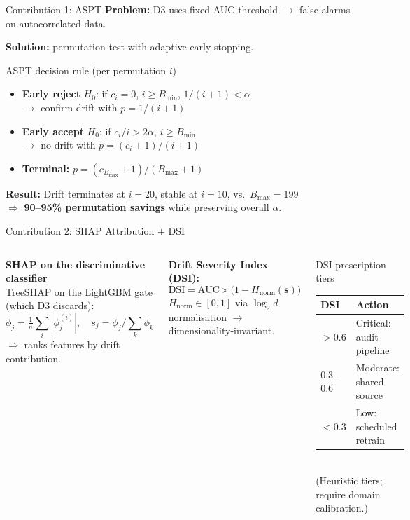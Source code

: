 \documentclass[aspectratio=169,10pt]{beamer}
\begin{document}
\begin{frame}{Contribution 1: ASPT}
\textbf{Problem:} D3 uses fixed AUC threshold $\to$ false alarms on autocorrelated data.

\textbf{Solution:} permutation test with adaptive early stopping.

\begin{block}{ASPT decision rule (per permutation $i$)}
\begin{itemize}\small
  \item \textbf{Early reject} $H_0$: if $c_i{=}0$, $i{\ge}B_{\min}$, $1/(i{+}1)<\alpha$ \\
        $\to$ confirm drift with $p = 1/(i{+}1)$
  \item \textbf{Early accept} $H_0$: if $c_i/i > 2\alpha$, $i{\ge}B_{\min}$ \\
        $\to$ no drift with $p = (c_i{+}1)/(i{+}1)$
  \item \textbf{Terminal:} $p = (c_{B_{\max}}{+}1)/(B_{\max}{+}1)$
\end{itemize}
\end{block}

\textbf{Result:} Drift terminates at $i{=}20$, stable at $i{=}10$, vs.\ $B_{\max}{=}199$ \\
$\Rightarrow$ \textbf{90--95\% permutation savings} while preserving overall $\alpha$.
\end{frame}

\begin{frame}{Contribution 2: SHAP Attribution + DSI}
\begin{columns}[T]
\textbf{SHAP on the discriminative classifier} \\
TreeSHAP on the LightGBM gate (which D3 discards):
\[
\bar\phi_j = \tfrac{1}{n}\sum_i |\phi_j^{(i)}|, \quad
s_j = \bar\phi_j / \textstyle\sum_k \bar\phi_k
\]
$\Rightarrow$ ranks features by drift contribution.

\medskip
\textbf{Drift Severity Index (DSI):}
\[
\mathrm{DSI} = \mathrm{AUC} \times \bigl(1 - H_{\mathrm{norm}}(\mathbf{s})\bigr)
\]
$H_{\mathrm{norm}} \in [0,1]$ via $\log_2 d$ normalisation $\to$ dimensionality-invariant.

\begin{block}{DSI prescription tiers}
\small
\begin{tabular}{ll}
\toprule
\textbf{DSI} & \textbf{Action} \\
\midrule
$>0.6$ & Critical: audit pipeline \\
$0.3$--$0.6$ & Moderate: shared source \\
$<0.3$ & Low: scheduled retrain \\
\bottomrule
\end{tabular}
\\[3pt]
{\scriptsize (Heuristic tiers; require domain calibration.)}
\end{block}
\end{columns}
\end{frame}
\end{document}
